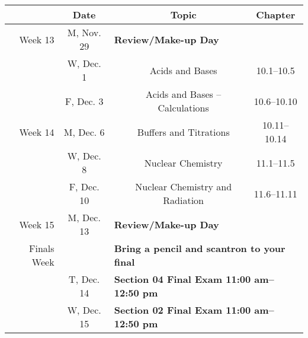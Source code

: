 \documentclass[12pt, letterpaper]{article}
\begin{document}
\begin{tabular}{rcccc}
& Date && Topic & Chapter\\
	\midrule
	Week 13 & M, Nov. 29& \multicolumn{3}{l}{\textbf{Review/Make-up Day}}\\
	& W, Dec. 1&& Acids and Bases & 10.1--10.5\\
	& F, Dec. 3&& Acids and Bases -- Calculations & 10.6--10.10\\
	\midrule
	Week 14 & M, Dec. 6&& Buffers and Titrations & 10.11--10.14\\
	& W, Dec. 8&& Nuclear Chemistry & 11.1--11.5\\
	& F, Dec. 10&& Nuclear Chemistry and Radiation & 11.6--11.11\\
	\midrule
	Week 15 & M, Dec. 13& \multicolumn{3}{l}{\textbf{Review/Make-up Day}}\\
	\midrule
	Finals Week & & \multicolumn{3}{l}{\textbf{Bring a pencil and scantron to your final}}\\
	& T, Dec. 14& \multicolumn{3}{l}{\textbf{Section 04 Final Exam 11:00 am--12:50 pm}}\\
	& W, Dec. 15& \multicolumn{3}{l}{\textbf{Section 02 Final Exam 11:00 am--12:50 pm}}\\
\end{tabular}
\end{document}
